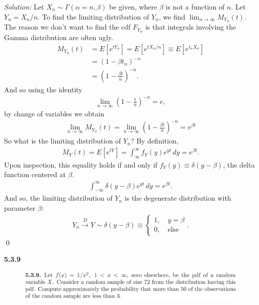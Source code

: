 \documentclass{book}
\theoremstyle{definition}
\newcommand{\nn}{\nonumber}
\newcommand{\al}{\alpha}
\newcommand{\be}{\beta}
\newcommand{\f}[2]{\frac{#1}{#2}}
\newcommand{\lp}{\left(}
\newcommand{\rp}{\right)}
\begin{document}
\noindent \textit{Solution:} Let $X_n \sim \Gamma(\al = n, \be)$ be given, where $\be$ is not a function of $n$. Let $Y_n = X_n/n$. To find the limiting distribution of $Y_n$, we find $\lim_{n\to \infty} M_{Y_n}(t)$. The reason we don't want to find the cdf $F_{Y_n}$ is that integrals involving the Gamma distribution are often ugly.
\begin{align}
M_{Y_n}(t) &= E[e^{tY_n}] =  E[e^{tX_n/n}] \equiv E[e^{t_n X_n}] \nn\\
&= (1 - \be t_n)^{-n}\nn\\
&= \lp 1 - \f{\beta t}{n} \rp^{-n}.
\end{align}
And so using the identity 
\begin{align}
\lim_{n\to \infty} \lp 1- \f{1}{n} \rp^{-n} = e,
\end{align}
by change of variables we obtain
\begin{align}
\lim_{n\to \infty}M_{Y_n}(t) = \lim_{n\to \infty} \lp 1 - \f{\beta t}{n} \rp^{-n} = e^{\be t} 
\end{align}
So what is the limiting distribution of $Y_n$? By definition,
\begin{align}
M_Y(t) = E[e^{tY}] = \int_\infty^\infty f_Y(y)e^{yt}\,dy  = e^{\beta t}.
\end{align}
Upon inspection, this equality holds if and only if $f_Y(y) \equiv \delta(y-\beta)$, the delta function centered at $\beta$. 
\begin{align}
\int^\infty_{-\infty} \delta(y-\beta)e^{yt}\,dy = e^{\beta t}.
\end{align}
And so, the limiting distribution of $Y_n$ is the degenerate distribution with parameter $\beta$:
\begin{align}
Y_n \xrightarrow{D} Y \sim \delta(y - \beta) \equiv \begin{cases}
1, \quad y = \beta\\
0, \quad \text{else}
\end{cases}.
\end{align}
\qed












\newpage



\noindent \textbf{5.3.9}

\begin{figure}[!htb]
	\includegraphics[scale=0.25]{539}
\end{figure}
\end{document}

